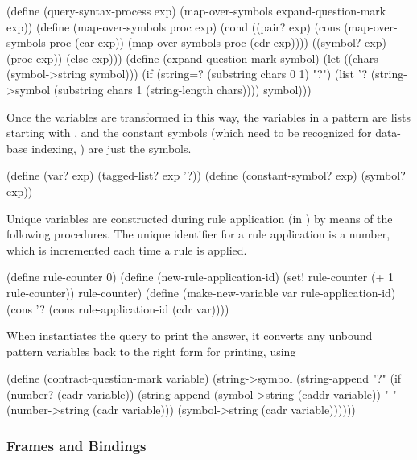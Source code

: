 \begin{codeBlock}
(define (query-syntax-process exp)
  (map-over-symbols expand-question-mark exp))
(define (map-over-symbols proc exp)
  (cond ((pair? exp)
         (cons (map-over-symbols proc (car exp))
               (map-over-symbols proc (cdr exp))))
        ((symbol? exp) (proc exp))
        (else exp)))
(define (expand-question-mark symbol)
  (let ((chars (symbol->string symbol)))
    (if (string=? (substring chars 0 1) "?")
        (list '?
              (string->symbol
               (substring chars 1 (string-length chars))))
        symbol)))
\end{codeBlock}

\noindent
Once the variables are transformed in this way, the variables in a pattern are
lists starting with , and the constant symbols (which need to be
recognized for data-base indexing, ) are just the symbols.

\begin{codeBlock}
(define (var? exp) (tagged-list? exp '?))
(define (constant-symbol? exp) (symbol? exp))
\end{codeBlock}

\noindent
Unique variables are constructed during rule application (in
) by means of the following procedures.
The unique identifier for
a rule application is a number, which is incremented each time a rule is
applied.

\begin{codeBlock}
(define rule-counter 0)
(define (new-rule-application-id)
  (set! rule-counter (+ 1 rule-counter))
  rule-counter)
(define (make-new-variable var rule-application-id)
  (cons '? (cons rule-application-id (cdr var))))
\end{codeBlock}

\noindent
When  instantiates the query to print the answer, it
converts any unbound pattern variables back to the right form for printing,
using

\begin{codeBlock}
(define (contract-question-mark variable)
  (string->symbol
   (string-append "?"
     (if (number? (cadr variable))
         (string-append (symbol->string (caddr variable))
                        "-"
                        (number->string (cadr variable)))
         (symbol->string (cadr variable))))))
\end{codeBlock}

\subsubsection{Frames and Bindings}
\label{Section 4.4.4.8}

